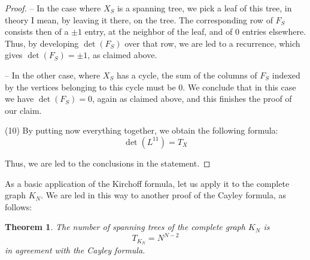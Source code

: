 \documentclass[12pt]{amsbook}
\newtheorem{theorem}{Theorem}[chapter]
\begin{document}
\begin{proof}
\medskip

-- In the case where $X_S$ is a spanning tree, we pick a leaf of this tree, in theory I mean, by leaving it there, on the tree. The corresponding row of $F_S$ consists then of a $\pm1$ entry, at the neighbor of the leaf, and of $0$ entries elsewhere. Thus, by developing $\det(F_S)$ over that row, we are led to a recurrence, which gives $\det(F_S)=\pm1$, as claimed above.

\medskip

-- In the other case, where $X_S$ has a cycle, the sum of the columns of $F_S$ indexed by the vertices belonging to this cycle must be $0$. We conclude that in this case we have $\det(F_S)=0$, again as claimed above, and this finishes the proof of our claim.

\medskip

(10) By putting now everything together, we obtain the following formula:
$$\det(L^{11})=T_X$$

Thus, we are led to the conclusions in the statement.
\end{proof}

As a basic application of the Kirchoff formula, let us apply it to the complete graph $K_N$. We are led in this way to another proof of the Cayley formula, as follows:


\begin{theorem}
The number of spanning trees of the complete graph $K_N$ is
$$T_{K_N}=N^{N-2}$$
in agreement with the Cayley formula.
\end{theorem}
\end{document}
